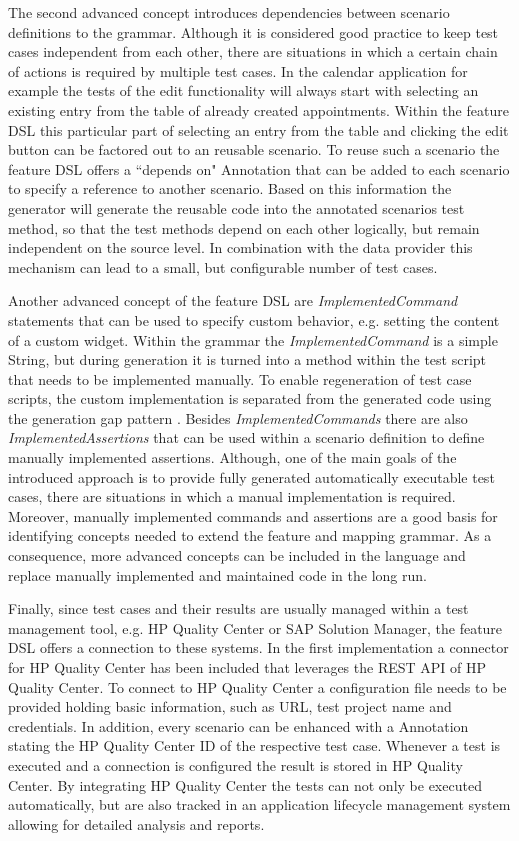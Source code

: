 \documentclass{sig-alternate-05-2015}
\begin{document}
The second advanced concept introduces dependencies between scenario definitions to the grammar.
Although it is considered good practice to keep test cases independent from each other, there are situations in which a certain chain of actions is required by multiple test cases.
In the calendar application for example the tests of the edit functionality will always start with selecting an existing entry from the table of already created appointments.
Within the feature DSL this particular part of selecting an entry from the table and clicking the edit button can be factored out to an reusable scenario.
To reuse such a scenario the feature DSL offers a ``depends on" Annotation that can be added to each scenario to specify a reference to another scenario.
Based on this information the generator will generate the reusable code into the annotated scenarios test method, so that the test methods depend on each other logically, but remain independent on the source level.
In combination with the data provider this mechanism can lead to a small, but configurable number of test cases.

Another advanced concept of the feature DSL are \textit{ImplementedCommand} statements that can be used to specify custom behavior, e.g. setting the content of a custom widget.
Within the grammar the \textit{ImplementedCommand} is a simple String, but during generation it is turned into a method within the test script that needs to be implemented manually. 
To enable regeneration of test case scripts, the custom implementation is separated from the generated code using the generation gap pattern \cite{behrens.2009}.
Besides \textit{ImplementedCommands} there are also \textit{ImplementedAssertions} that can be used within a scenario definition to define manually implemented assertions.
Although, one of the main goals of the introduced approach is to provide fully generated automatically executable test cases, there are situations in which a manual implementation is required. 
Moreover, manually implemented commands and assertions are a good basis for identifying concepts needed to extend the feature and mapping grammar.
As a consequence, more advanced concepts can be included in the language and replace manually implemented and maintained code in the long run.

Finally, since test cases and their results are usually managed within a test management tool, e.g. HP Quality Center or SAP Solution Manager, the feature DSL offers a connection to these systems.
In the first implementation a connector for HP Quality Center has been included that leverages the REST API of HP Quality Center.
To connect to HP Quality Center a configuration file needs to be provided holding basic information, such as URL, test project name and credentials.
In addition, every scenario can be enhanced with a Annotation stating the HP Quality Center ID of the respective test case.
Whenever a test is executed and a connection is configured the result is stored in HP Quality Center.
By integrating HP Quality Center the tests can not only be executed automatically, but are also tracked in an application lifecycle management system allowing for detailed analysis and reports.
\end{document}
